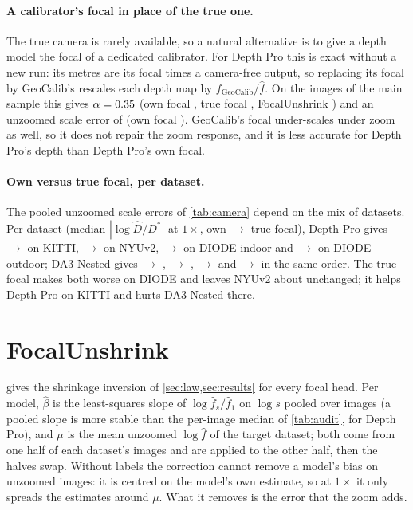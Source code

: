 \documentclass[10pt,twocolumn,letterpaper]{article}
\begin{document}
\paragraph{A calibrator's focal in place of the true one.} The true camera is rarely available, so a natural
alternative is to give a depth model the focal of a dedicated calibrator. For Depth Pro this is exact without a new
run: its metres are its focal times a camera-free output, so replacing its focal by GeoCalib's rescales each depth map
by $f_{\text{GeoCalib}}/\hat f$. On the \depthproGeocalibImages{} images of the main sample this gives
$\alpha=0.35$ (own focal \DepthproCamOwnAlpha, true focal \DepthproCamGivenAlpha, FocalUnshrink
\DepthproUnshrinkAlphacorr) and an unzoomed scale error of \depthproGeocalibScale{} (own focal \DepthproCamOwnScale).
GeoCalib's focal under-scales under zoom as well, so it does not repair the zoom response, and it is less accurate
for Depth Pro's depth than Depth Pro's own focal.

\paragraph{Own versus true focal, per dataset.} The pooled unzoomed scale errors of \cref{tab:camera} depend on the
mix of datasets. Per dataset (median $|\log\hat D/D^{*}|$ at $1\times$, own $\to$ true focal), Depth Pro gives
\DepthproCamOwnScaleKitti{} $\to$ \DepthproCamGivenScaleKitti{} on KITTI, \DepthproCamOwnScaleNyu{} $\to$
\DepthproCamGivenScaleNyu{} on NYUv2, \DepthproCamOwnScaleDiodeIn{} $\to$ \DepthproCamGivenScaleDiodeIn{} on
DIODE-indoor and \DepthproCamOwnScaleDiodeOut{} $\to$ \DepthproCamGivenScaleDiodeOut{} on DIODE-outdoor;
DA3-Nested gives \DaThreeNestedCamOwnScaleKitti{} $\to$ \DaThreeNestedCamGivenScaleKitti,
\DaThreeNestedCamOwnScaleNyu{} $\to$ \DaThreeNestedCamGivenScaleNyu, \DaThreeNestedCamOwnScaleDiodeIn{} $\to$
\DaThreeNestedCamGivenScaleDiodeIn{} and \DaThreeNestedCamOwnScaleDiodeOut{} $\to$
\DaThreeNestedCamGivenScaleDiodeOut{} in the same order. The true focal makes both worse on DIODE and leaves NYUv2
about unchanged; it helps Depth Pro on KITTI and hurts DA3-Nested there.

\section{FocalUnshrink}\label{sec:supp_unshrink}

 gives the shrinkage inversion of \cref{sec:law,sec:results} for every focal head. Per model,
$\hat\beta$ is the least-squares slope of $\log\hat f_s/\hat f_1$ on $\log s$ pooled over images (a pooled slope
is more stable than the per-image median of \cref{tab:audit}, \DepthproBeta{} for Depth Pro), and $\mu$ is the mean
unzoomed $\log\hat f$ of the target dataset; both come from one half of each dataset's images and are applied to
the other half, then the halves swap. Without labels the correction cannot remove a model's bias on unzoomed
images: it is centred on the model's own estimate, so at $1\times$ it only spreads the estimates around $\mu$.
What it removes is the error that the zoom adds.
\end{document}
